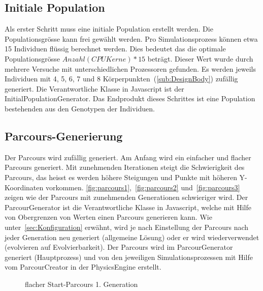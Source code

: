     \subsection{Initiale Population\label{sec:initPop}}

      Als erster Schritt muss eine initiale Population erstellt werden. Die Populationsgrösse kann frei gewählt werden.
      Pro Simulationsprozess können etwa 15 Individuen flüssig berechnet werden.
      Dies bedeutet das die optimale Populationsgrösse  \( Anzahl(CPU Kerne) * 15 \) beträgt.
      Dieser Wert wurde durch mehrere Versuche mit unterschiedlichen Prozessoren gefunden.
      Es werden jeweils Individuen mit 4, 5, 6, 7 und 8 Körperpunkten~(\vref{sub:DesignBody}) zufällig generiert.
      Die Verantwortliche Klasse in Javascript ist der InitialPopulationGenerator.
      Das Endprodukt dieses Schrittes ist eine Population bestehenden aus den Genotypen der Individuen.

    \subsection{Parcours-Generierung\label{sec:Parcour Generierung}}

      Der Parcours wird zufällig generiert. Am Anfang wird ein einfacher und flacher Parcours generiert.
      Mit zunehmenden Iterationen steigt die Schwierigkeit des Parcours,
      das heisst es werden höhere Steigungen und Punkte mit höheren Y-Koordinaten vorkommen.
      \vref{fig:parcours1},~\vref{fig:parcours2} und~\vref{fig:parcours3} zeigen
      wie der Parcours mit zunehmenden Generationen schwieriger wird.
      Der ParcourGenerator ist die Verantwortliche Klasse in Javascript,
      welche mit Hilfe von Obergrenzen von Werten einen Parcours generieren kann.
      Wie unter~\ref{sec:Konfiguration} erwähnt,
      wird je nach Einstellung der Parcours nach jeder Generation neu generiert (allgemeine Lösung) oder
      er wird wiederverwendet (evolvieren auf Evolvierbarkeit).
      Der Parcours wird im ParcourGenerator generiert (Hauptprozess) und
      von den jeweiligen Simulationsprozessen mit Hilfe vom ParcourCreator in der \gls{PhysicsEngine} erstellt.

      \vspace{1cm}

      \begin{figure}[H]
        \centering
        
        \caption{flacher Start-Parcours 1. Generation\label{fig:parcours1}}
      \end{figure}

